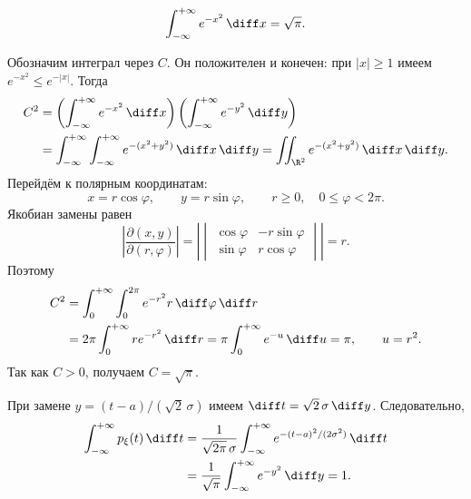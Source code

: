 
\begin{lemma}
    \[
        \int_{-\infty}^{+\infty}e^{-x^2}\,\diff x=\sqrt\pi.
    \]
\end{lemma}

\begin{Proof}
    Обозначим интеграл через $C$. Он положителен и конечен:
    при $|x|\geq1$ имеем $e^{-x^2}\leq e^{-|x|}$.
    Тогда
    \[
        \begin{aligned}
            C^2
            &=\left(\int_{-\infty}^{+\infty}e^{-x^2}\,\diff x\right)
              \left(\int_{-\infty}^{+\infty}e^{-y^2}\,\diff y\right)\\
            &=\int_{-\infty}^{+\infty}\int_{-\infty}^{+\infty}
              e^{-(x^2+y^2)}\,\diff x\,\diff y
              =\iint_{\R^2}e^{-(x^2+y^2)}\,\diff x\,\diff y.
        \end{aligned}
    \]
    Перейдём к полярным координатам:
    \[
        x=r\cos\varphi,\qquad y=r\sin\varphi,
        \qquad r\geq0,\quad0\leq\varphi<2\pi.
    \]
    Якобиан замены равен
    \[
        \left|\frac{\partial(x,y)}{\partial(r,\varphi)}\right|
        =\left|\begin{vmatrix}
            \cos\varphi&-r\sin\varphi\\
            \sin\varphi&r\cos\varphi
        \end{vmatrix}\right|=r.
    \]
    Поэтому
    \[
        \begin{aligned}
            C^2&=\int_0^{+\infty}\int_0^{2\pi}
                  e^{-r^2}r\,\diff\varphi\,\diff r\\
               &=2\pi\int_0^{+\infty}r e^{-r^2}\,\diff r
                 =\pi\int_0^{+\infty}e^{-u}\,\diff u=\pi,
                 \qquad u=r^2.
        \end{aligned}
    \]
    Так как $C>0$, получаем $C=\sqrt\pi$.
\end{Proof}

\begin{Proof}
    При замене $y=(t-a)/(\sqrt2\,\sigma)$ имеем
    $\diff t=\sqrt2\,\sigma\,\diff y$. Следовательно,
    \[
        \begin{aligned}
            \int_{-\infty}^{+\infty}p_\xi(t)\,\diff t
            &=\frac{1}{\sqrt{2\pi}\,\sigma}
              \int_{-\infty}^{+\infty}
              e^{-(t-a)^2/(2\sigma^2)}\,\diff t\\
            &=\frac1{\sqrt\pi}\int_{-\infty}^{+\infty}
              e^{-y^2}\,\diff y=1.
        \end{aligned}
    \]
\end{Proof}

